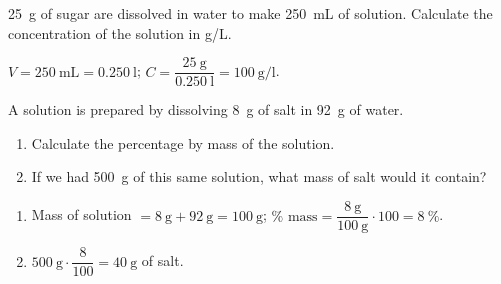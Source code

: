 


\begin{exercise}
    \qty{25}{\g} of sugar are dissolved in water to make \qty{250}{\mL} of solution. Calculate the concentration of the solution in g/L.
    \begin{solu}
        \(V = \qty{250}{\mL} = \qty{0.250}{\litre}\); \quad \(C = \dfrac{\qty{25}{\g}}{\qty{0.250}{\litre}} = \qty{100}{\g\per\litre}\).
    \end{solu}
\end{exercise}

\begin{exercise}
    A solution is prepared by dissolving \qty{8}{\g} of salt in \qty{92}{\g} of water.
    \begin{enumerate}[label=\letraminuscula]
        \item Calculate the percentage by mass of the solution.
        \item If we had \qty{500}{\g} of this same solution, what mass of salt would it contain?
    \end{enumerate}
    \begin{solu}
        \begin{enumerate}[label=\alph*)]
            \item Mass of solution \(= \qty{8}{\g} + \qty{92}{\g} = \qty{100}{\g}\); \quad \(\% \text{ mass} = \dfrac{\qty{8}{\g}}{\qty{100}{\g}} \cdot 100 = \qty{8}{\percent}\).
            \item \(\qty{500}{\g} \cdot \dfrac{8}{100} = \qty{40}{\g}\) of salt.
        \end{enumerate}
    \end{solu}
\end{exercise}

